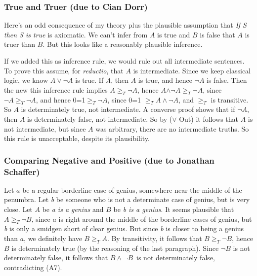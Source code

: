 \subsubsection*{True and Truer (due to Cian Dorr)}

Here's an odd consequence of my theory plus the plausible assumption that \textit{If S then S is true} is axiomatic. We can't infer from \(A\) is true and \(B\) is false that \(A\) is truer than \(B\). But this looks like a reasonably plausible inference.

If we added this as inference rule, we would rule out all intermediate sentences. To prove this assume, for \textit{reductio}, that \(A\) is intermediate. Since we keep classical logic, we know \(A \vee \neg A\) is true. If\textit{ A}, then \(A\) is true, and hence \(\neg A\) is false. Then the new this inference rule implies \(A \geqslant _T \neg A\), hence \(A\)${\wedge}{\neg}$\(A \geqslant _T \neg A\), since \(\neg A \geqslant _T \neg A\), and hence 0=1\(\geqslant _T \neg A\), since 0=1 \(\geqslant _T A \wedge \neg A\), and \(\geqslant _T\) is transitive. So \(A\) is determinately true, not intermediate. A converse proof shows that if \(\neg A\), then \(A\) is determinately false, not intermediate. So by (\(\vee\){}-Out) it follows that \(A\) is not intermediate, but since \(A\) was arbitrary, there are no intermediate truths. So this rule is unacceptable, despite its plausibility.

\subsubsection*{Comparing Negative and Positive (due to Jonathan Schaffer)}

Let \(a\) be a regular borderline case of genius, somewhere near the middle of the penumbra. Let \textit{b} be someone who is not a determinate case of genius, but is very close. Let \(A\) be \textit{a is a genius} and \(B\) be \textit{b is a genius}. It seems plausible that \(A \geqslant _T \neg B\), since \(a\) is right around the middle of the borderline cases of genius, but \textit{b} is only a smidgen short of clear genius. But since \textit{b} is closer to being a genius than \(a\), we definitely have \(B \geqslant _T A\). By transitivity, it follows that \(B \geqslant _T \neg B\), hence \(B\) is determinately true (by the reasoning of the last paragraph). Since \(\neg B\) is not determinately false, it follows that \(B \wedge \neg B\)~is not determinately false, contradicting (A7).

